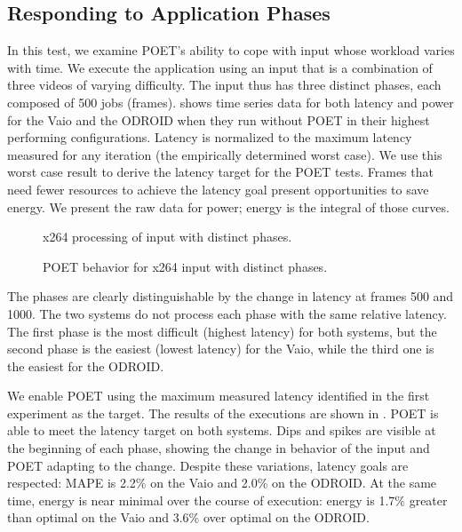 

\subsection{Responding to Application Phases}
\label{sec:poet-eval-phases}

In this test, we examine POET's ability to cope with input whose workload varies with time.
We execute the  application using an input that is a combination of three videos of varying difficulty.
The input thus has three distinct phases, each composed of 500 jobs (frames).
 shows time series data for both latency and power for the Vaio and the ODROID when they run without POET in their highest performing configurations.
Latency is normalized to the maximum latency measured for any iteration (\ie the empirically determined worst case).
We use this worst case result to derive the latency target for the POET tests.
Frames that need fewer resources to achieve the latency goal present opportunities to save energy.
We present the raw data for power; energy is the integral of those curves.

\begin{figure}[t]
  \centering
  
  \caption{x264 processing of input with distinct phases.}
  \label{fig:poet-phases-default}
\end{figure}
\begin{figure}[t]
  \centering
      
  \caption{POET behavior for x264 input with distinct phases.}
  \label{fig:poet-phases-x264}
\end{figure}

The phases are clearly distinguishable by the change in latency at frames 500 and 1000.
The two systems do not process each phase with the same relative latency.
The first phase is the most difficult (highest latency) for both systems, but the second phase is the easiest (lowest latency) for the Vaio, while the third one is the easiest for the ODROID.

We enable POET using the maximum measured latency identified in the first experiment as the target.
The results of the executions are shown in .
POET is able to meet the latency target on both systems.
Dips and spikes are visible at the beginning of each phase, showing the change in behavior of the input and POET adapting to the change.
Despite these variations, latency goals are respected: MAPE is 2.2\% on the Vaio and 2.0\% on the ODROID.
At the same time, energy is near minimal over the course of execution: energy is 1.7\% greater than optimal on the Vaio and 3.6\% over optimal on the ODROID.


